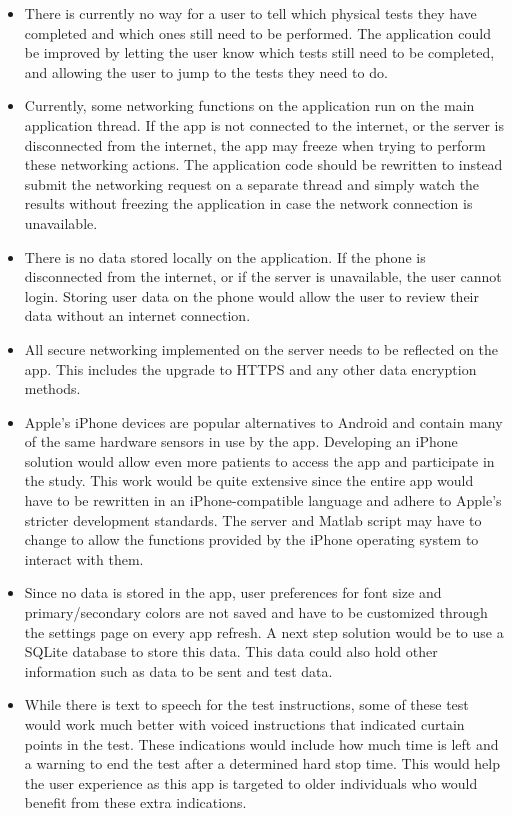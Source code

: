 \documentclass[conference]{IEEEtran}
\begin{document}
\begin{itemize}
    \item There is currently no way for a user to tell which physical tests they have completed and which ones still need to be performed. The application could be improved by letting the user know which tests still need to be completed, and allowing the user to jump to the tests they need to do. 
    \item Currently, some networking functions on the application run on the main application thread. If the app is not connected to the internet, or the server is disconnected from the internet, the app may freeze when trying to perform these networking actions. The application code should be rewritten to instead submit the networking request on a separate thread and simply watch the results without freezing the application in case the network connection is unavailable. 
    \item There is no data stored locally on the application. If the phone is disconnected from the internet, or if the server is unavailable, the user cannot login. Storing user data on the phone would allow the user to review their data without an internet connection. 
    \item All secure networking implemented on the server needs to be reflected on the app. This includes the upgrade to HTTPS and any other data encryption methods. 
    \item Apple's iPhone devices are popular alternatives to Android and contain many of the same hardware sensors in use by the app. Developing an iPhone solution would allow even more patients to access the app and participate in the study. This work would be quite extensive since the entire app would have to be rewritten in an iPhone-compatible language and adhere to Apple's stricter development standards. The server and Matlab script may have to change to allow the functions provided by the iPhone operating system to interact with them. 
    \item Since no data is stored in the app, user preferences for font size and primary/secondary colors are not saved and have to be customized through the settings page on every app refresh. A next step solution would be to use a SQLite database to store this data. This data could also hold other information such as data to be sent and test data.
    \item While there is text to speech for the test instructions, some of these test would work much better with voiced instructions that indicated curtain points in the test. These indications would include how much time is left and a warning to end the test after a determined hard stop time. This would help the user experience as this app is targeted to older individuals who would benefit from these extra indications.
\end{itemize}
\end{document}
